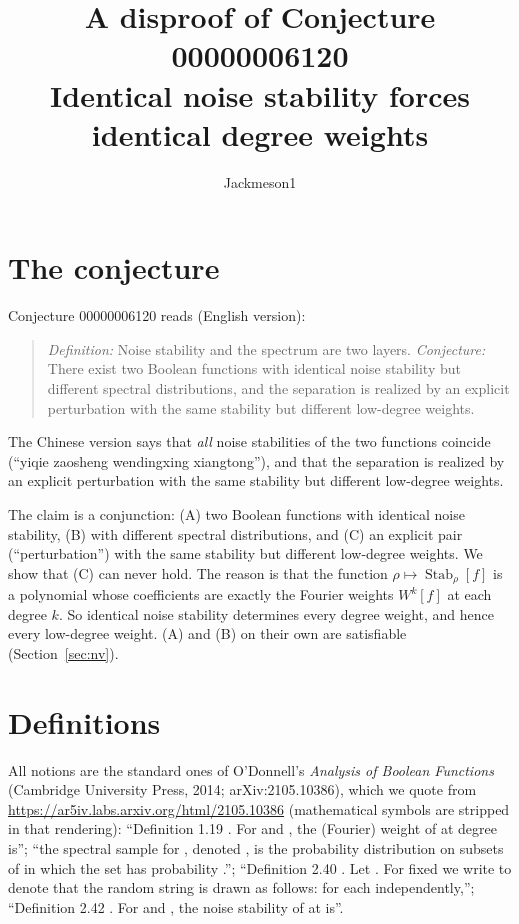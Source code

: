 \documentclass[11pt]{article}
\title{A disproof of Conjecture 00000006120\\[2pt]
\large Identical noise stability forces identical degree weights}
\author{Jackmeson1}
\date{}
\theoremstyle{definition}
\theoremstyle{remark}
\renewcommand{\_}{\oldus\allowbreak}
\newcommand{\Stab}{\operatorname{Stab}}
\begin{document}
\sloppy
\maketitle

\section{The conjecture}

Conjecture 00000006120 reads (English version):

\begin{quote}
\emph{Definition:} Noise stability and the spectrum are two layers.
\emph{Conjecture:} There exist two Boolean functions with identical noise stability but different
spectral distributions, and the separation is realized by an explicit perturbation with the same
stability but different low-degree weights.
\end{quote}

The Chinese version says that \emph{all} noise stabilities of the two functions coincide
(``yiqie zaosheng wendingxing xiangtong''), and that the separation is realized by an explicit
perturbation with the same stability but different low-degree weights.

The claim is a conjunction: (A) two Boolean functions with identical noise stability, (B) with
different spectral distributions, and (C) an explicit pair (``perturbation'') with the same
stability but different low-degree weights. We show that (C) can never hold. The reason is that
the function $\rho\mapsto\Stab_\rho[f]$ is a polynomial whose coefficients are exactly the Fourier
weights $W^k[f]$ at each degree $k$. So identical noise stability determines every degree weight,
and hence every low-degree weight. (A) and (B) on their own are satisfiable (Section~\ref{sec:nv}).

\section{Definitions}

All notions are the standard ones of O'Donnell's \emph{Analysis of Boolean Functions}
(Cambridge University Press, 2014; arXiv:2105.10386), which we quote from
\url{https://ar5iv.labs.arxiv.org/html/2105.10386} (mathematical symbols are stripped in that
rendering):
``Definition 1.19 . For and , the (Fourier) weight of at degree is'';
``the spectral sample for , denoted , is the probability distribution on subsets of in which the set
has probability .'';
``Definition 2.40 . Let . For fixed we write to denote that the random string is drawn as follows:
for each independently,'';
``Definition 2.42 . For and , the noise stability of at is''.
\end{document}
